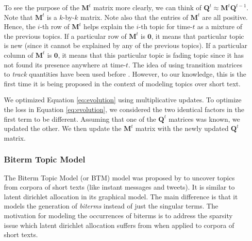 To see the purpose of the $\textbf{M}^t$ matrix more clearly, we can think of $\textbf{Q}^t \approx \textbf{M}^t\textbf{Q}^{t-1}$.
Note that $\textbf{M}^t$ is a $k$-by-$k$ matrix.  Note also that the entries of $\textbf{M}^t$ are all positive.  
Hence, the $i$-th row of $\textbf{M}^{t}$ helps explain the $i$-th topic for time-$t$ as a mixture of the previous topics.
If a particular row of $\textbf{M}^t$ is $\textbf{0}$, it means that particular topic is new (since it cannot be
explained by any of the previous topics).  If a particular column of $\textbf{M}^t$ is $\textbf{0}$, it means that this
particular topic is fading topic since it has not found its presence anywhere at time-$t$.  
The idea of using transition matrices to \emph{track} quantities have been used before \cite{Kalyanam:2015,Vaca:2014}.
However, to our knowledge, this is the first time it is being proposed in the context of modeling topics over short text.  

We optimized Equation \ref{eq:evolution} using multiplicative updates.
To optimize the loss in Equation \ref{eq:evolution}, we considered the two identical factors in the first term 
to be different.  Assuming that one of the $\textbf{Q}^t$ matrices was known, we updated the other.  
We then update the $\textbf{M}^t$ matrix with the newly updated $\textbf{Q}^t$ matrix.  

\subsubsection{Biterm Topic Model}
The Biterm Topic Model (or BTM) model was proposed by \cite{Yan:2013:BTM} to uncover topics from corpora
of short texts (like instant messages and tweets).  It is similar to latent dirichlet
allocation \cite{blei2003} in its graphical model.  The main difference is that it
models the generation of \emph{biterms} instead of just the singular terms.  The motivation
for modeling the occurrences of biterms is to address the sparsity issue which latent dirichlet
allocation suffers from when applied to corpora of short texts.

